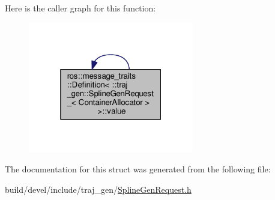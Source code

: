 Here is the caller graph for this function\+:
\nopagebreak
\begin{figure}[H]
\begin{center}
\leavevmode
\includegraphics[width=205pt]{structros_1_1message__traits_1_1_definition_3_01_1_1traj__gen_1_1_spline_gen_request___3_01_container_allocator_01_4_01_4_a165a0952728f34e75639a65df1f2f57c_icgraph}
\end{center}
\end{figure}




The documentation for this struct was generated from the following file\+:\begin{DoxyCompactItemize}
\item 
build/devel/include/traj\+\_\+gen/\hyperlink{_spline_gen_request_8h}{Spline\+Gen\+Request.\+h}\end{DoxyCompactItemize}
